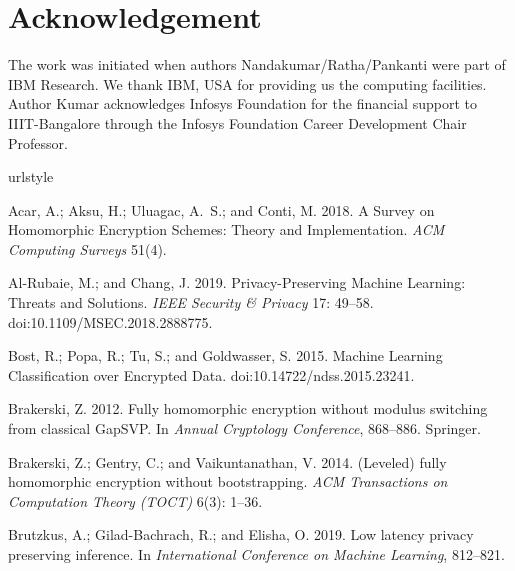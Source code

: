 \documentclass[letterpaper]{article} %
\begin{document}
\section{Acknowledgement}
\label{sec:acknowledgement}
The work was initiated when authors Nandakumar/Ratha/Pankanti were part of IBM Research. We thank IBM, USA for providing us the computing facilities. Author Kumar acknowledges Infosys Foundation for the financial support to IIIT-Bangalore through the Infosys Foundation Career Development Chair Professor.

\begin{thebibliography}{25}
\providecommand{\natexlab}[1]{#1}
\providecommand{\url}[1]{\texttt{#1}}
\providecommand{\urlprefix}{URL }
\expandafter\ifx\csname urlstyle\endcsname\relax
  \providecommand{\doi}[1]{doi:\discretionary{}{}{}#1}\else
  \providecommand{\doi}{doi:\discretionary{}{}{}\begingroup
  \urlstyle{rm}\Url}\fi

Acar, A.; Aksu, H.; Uluagac, A.~S.; and Conti, M. 2018.
\newblock A Survey on Homomorphic Encryption Schemes: Theory and
  Implementation.
\newblock \emph{ACM Computing Surveys} 51(4).

Al-Rubaie, M.; and Chang, J. 2019.
\newblock Privacy-Preserving Machine Learning: Threats and Solutions.
\newblock \emph{IEEE Security \& Privacy} 17: 49--58.
\newblock \doi{10.1109/MSEC.2018.2888775}.

Bost, R.; Popa, R.; Tu, S.; and Goldwasser, S. 2015.
\newblock Machine Learning Classification over Encrypted Data.
\newblock \doi{10.14722/ndss.2015.23241}.

Brakerski, Z. 2012.
\newblock Fully homomorphic encryption without modulus switching from classical
  GapSVP.
\newblock In \emph{Annual Cryptology Conference}, 868--886. Springer.

Brakerski, Z.; Gentry, C.; and Vaikuntanathan, V. 2014.
\newblock (Leveled) fully homomorphic encryption without bootstrapping.
\newblock \emph{ACM Transactions on Computation Theory (TOCT)} 6(3): 1--36.

Brutzkus, A.; Gilad-Bachrach, R.; and Elisha, O. 2019.
\newblock Low latency privacy preserving inference.
\newblock In \emph{International Conference on Machine Learning}, 812--821.


\end{thebibliography}
\end{document}
